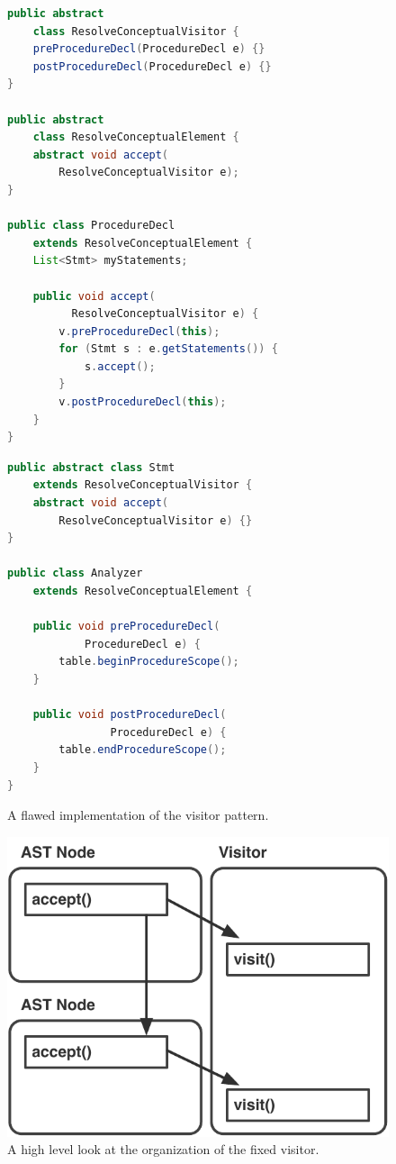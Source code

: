 \documentclass[times]{speauth}
\begin{document}
\begin{figure}[!htb]
\centering
\begin{minipage}{.45\textwidth}
\begin{lstlisting}[language=java]
public abstract
	class ResolveConceptualVisitor {
    preProcedureDecl(ProcedureDecl e) {}
    postProcedureDecl(ProcedureDecl e) {}
}

public abstract 
	class ResolveConceptualElement {
    abstract void accept(
        ResolveConceptualVisitor e);
}

public class ProcedureDecl
	extends ResolveConceptualElement {	
    List<Stmt> myStatements;
    
    public void accept(
    	  ResolveConceptualVisitor e) {
        v.preProcedureDecl(this);
        for (Stmt s : e.getStatements()) {
            s.accept();
        }
        v.postProcedureDecl(this);
    }
}
\end{lstlisting}
\end{minipage}\quad
\begin{minipage}{.45\textwidth}
\begin{lstlisting}[language=java]
public abstract class Stmt
	extends ResolveConceptualVisitor {
    abstract void accept(
    	ResolveConceptualVisitor e) {}
}

public class Analyzer
	extends ResolveConceptualElement {
	
    public void preProcedureDecl(
  			ProcedureDecl e) {
        table.beginProcedureScope();
    }
    
    public void postProcedureDecl(
    			ProcedureDecl e) {
        table.endProcedureScope();
    }        
}
\end{lstlisting}
\end{minipage}
\caption{A flawed implementation of the visitor pattern.}
\label{fig:fixedvisitorexample}
\end{figure}

\begin{figure}[!htb]
\centering
\includegraphics[scale=.60]{figures/fixed_visitor_organization.pdf}
\caption{A high level look at the organization of the fixed visitor.}
\label{fig:fixedvisitororganization}
\end{figure}
\end{document}
